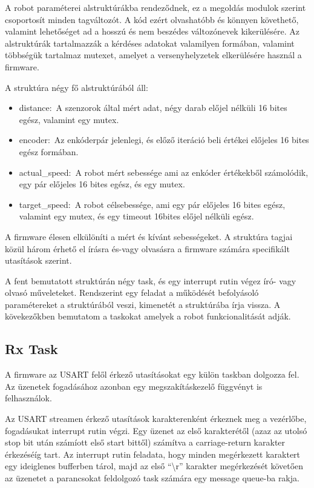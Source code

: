 A robot paraméterei alstruktúrákba rendeződnek, ez a megoldás modulok szerint
csoportosít minden tagváltozót. A kód ezért olvashatóbb és könnyen követhető,
valamint lehetőséget ad a hosszú és nem beszédes változónevek kikerülésére. Az
alstruktúrák tartalmazzák a kérdéses adatokat valamilyen formában, valamint
többségük tartalmaz mutexet, amelyet a versenyhelyzetek elkerülésére használ a
firmware.

A struktúra négy fő alstruktúrából áll:
\begin{itemize}
\item{distance:~A szenzorok által mért adat, négy darab előjel nélküli 16 bites
  egész, valamint egy mutex.}
\item{encoder:~Az enkóderpár jelenlegi, és előző iteráció beli értékei előjeles
  16 bites egész formában.}
\item{actual\_speed:~A robot mért sebessége ami az enkóder értékekből
  számolódik, egy pár előjeles 16 bites egész, és egy mutex.}
\item{target\_speed:~A robot célsebessége, ami egy pár előjeles 16 bites egész,
  valamint egy mutex, és egy timeout 16bites előjel nélküli egész.}
\end{itemize}

A firmware élesen elkülöníti a mért és kívánt sebességeket. A struktúra tagjai
közül három érhető el írásra és-vagy olvasásra a firmware számára specifikált
utasítások szerint.

\medskip

A fent bemutatott struktúrán négy task, és egy interrupt rutin végez író- vagy
olvasó műveleteket. Rendszerint egy feladat a működését befolyásoló paramétereket
a struktúrából veszi, kimenetét a struktúrába írja vissza. A kövekezőkben
bemutatom a taskokat amelyek a robot funkcionalitását adják.

\subsection{Rx Task}

A firmware az USART felől érkező utasításokat egy külön taskban dolgozza fel. Az
üzenetek fogadásához azonban egy megszakításkezelő függvényt is felhasználok.

Az USART streamen érkező utasítások karakterenként érkeznek meg a vezérlőbe,
fogadásukat interrupt rutin végzi. Egy üzenet az első karakterétől (azaz az
utolsó stop bit után számíott első start bittől) számítva a carriage-return
karakter érkezéséíg tart. Az interrupt rutin feladata, hogy minden megérkezett
karaktert egy ideiglenes bufferben tárol, majd az első ``\textbackslash{}r'' karakter
megérkezését követően az üzenetet a parancsokat feldolgozó task számára egy
message queue-ba rakja. 

